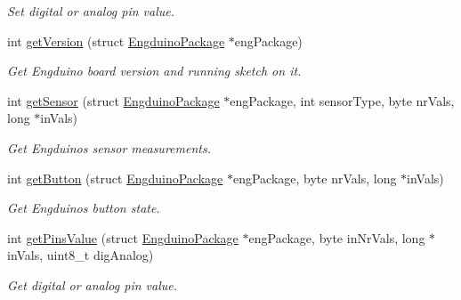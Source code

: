\begin{DoxyCompactItemize}
\begin{DoxyCompactList}\small\item\em Set digital or analog pin value. \end{DoxyCompactList}\item 
int \hyperlink{group___engduino_protocol_gad585cd4ca7ea413a137fe5783825a612}{get\+Version} (struct \hyperlink{struct_engduino_package}{Engduino\+Package} $\ast$eng\+Package)
\begin{DoxyCompactList}\small\item\em Get Engduino board version and running sketch on it. \end{DoxyCompactList}\item 
int \hyperlink{group___engduino_protocol_ga504071d488f9d2a9ace156c4523ea18d}{get\+Sensor} (struct \hyperlink{struct_engduino_package}{Engduino\+Package} $\ast$eng\+Package, int sensor\+Type, byte nr\+Vals, long $\ast$in\+Vals)
\begin{DoxyCompactList}\small\item\em Get Engduino\textquotesingle{}s sensor measurements. \end{DoxyCompactList}\item 
int \hyperlink{group___engduino_protocol_gad53e6d5d3c390c3eca7f0456aa7a5d05}{get\+Button} (struct \hyperlink{struct_engduino_package}{Engduino\+Package} $\ast$eng\+Package, byte nr\+Vals, long $\ast$in\+Vals)
\begin{DoxyCompactList}\small\item\em Get Engduino\textquotesingle{}s button state. \end{DoxyCompactList}\item 
int \hyperlink{group___engduino_protocol_ga6945fb3a4a3bb9b86e602168e21628b7}{get\+Pins\+Value} (struct \hyperlink{struct_engduino_package}{Engduino\+Package} $\ast$eng\+Package, byte in\+Nr\+Vals, long $\ast$in\+Vals, uint8\+\_\+t dig\+Analog)
\begin{DoxyCompactList}\small\item\em Get digital or analog pin value. \end{DoxyCompactList}\end{DoxyCompactItemize}

